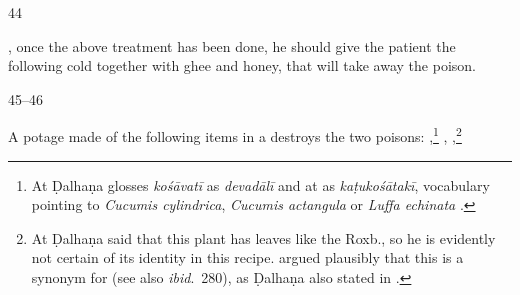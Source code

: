 \begin{translation}

%

\item[44] 

, once the above treatment has been done, he
should give the patient the following cold  together with ghee and 
honey, that will take away the poison.
    
    
    \item[45--46]
    
        A potage made of the following items in a 
 destroys the two poisons: 
,\footnote{At  Ḍalhaṇa glosses
\emph{kośāvatī} as \emph{devadālī} and at  as
\emph{kaṭukośātakī}, vocabulary pointing to \emph{Cucumis cylindrica},
\emph{Cucumis actangula} or \emph{Luffa echinata} \parencites[207,
121]{sing-1972}[252--253]{adps}.} %
, 
,\footnote{At  Ḍalhaṇa said that this plant 
has leaves like the  Roxb., so he is evidently not certain of 
its identity in this recipe. \citet[443]{sing-1972} argued plausibly that this is a synonym for 
 (see also \emph{ibid}.\ 280), as Ḍalhaṇa also 
stated in .}



\end{translation}
